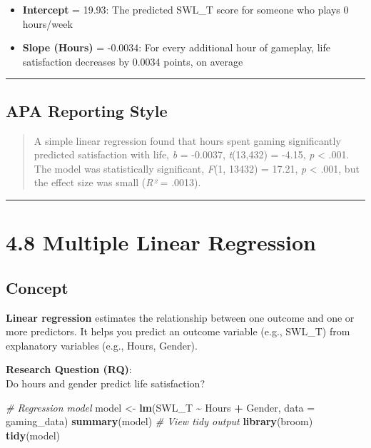 \documentclass[
]{book}
\newenvironment{Shaded}{\begin{snugshade}}{\end{snugshade}}
\newcommand{\AttributeTok}[1]{\textcolor[rgb]{0.13,0.29,0.53}{#1}}
\newcommand{\CommentTok}[1]{\textcolor[rgb]{0.56,0.35,0.01}{\textit{#1}}}
\newcommand{\FunctionTok}[1]{\textcolor[rgb]{0.13,0.29,0.53}{\textbf{#1}}}
\newcommand{\NormalTok}[1]{#1}
\newcommand{\OtherTok}[1]{\textcolor[rgb]{0.56,0.35,0.01}{#1}}
\newcommand{\SpecialCharTok}[1]{\textcolor[rgb]{0.81,0.36,0.00}{\textbf{#1}}}
\providecommand{\tightlist}{%
  \setlength{\itemsep}{0pt}\setlength{\parskip}{0pt}}
\begin{document}
\begin{itemize}
\tightlist
\item
  \textbf{Intercept} = 19.93: The predicted SWL\_T score for someone who plays 0 hours/week
\item
  \textbf{Slope (Hours)} = -0.0034: For every additional hour of gameplay, life satisfaction decreases by 0.0034 points, on average
\end{itemize}

\begin{center}\rule{0.5\linewidth}{0.5pt}\end{center}

\subsection{APA Reporting Style}\label{apa-reporting-style-2}

\begin{quote}
A simple linear regression found that hours spent gaming significantly predicted satisfaction with life, \emph{b} = -0.0037, \emph{t}(13,432) = -4.15, \emph{p} \textless{} .001. The model was statistically significant, \emph{F}(1, 13432) = 17.21, \emph{p} \textless{} .001, but the effect size was small (\emph{R²} = .0013).
\end{quote}

\begin{center}\rule{0.5\linewidth}{0.5pt}\end{center}

\section{4.8 Multiple Linear Regression}\label{multiple-linear-regression}

\subsection{Concept}\label{concept-7}

\textbf{Linear regression} estimates the relationship between one outcome and one or more predictors. It helps you predict an outcome variable (e.g., SWL\_T) from explanatory variables (e.g., Hours, Gender).

\textbf{Research Question (RQ)}:\\
Do hours and gender predict life satisfaction?

\begin{Shaded}
\begin{Highlighting}[]
\CommentTok{\# Regression model}
\NormalTok{model }\OtherTok{\textless{}{-}} \FunctionTok{lm}\NormalTok{(SWL\_T }\SpecialCharTok{\textasciitilde{}}\NormalTok{ Hours }\SpecialCharTok{+}\NormalTok{ Gender, }\AttributeTok{data =}\NormalTok{ gaming\_data)}
\FunctionTok{summary}\NormalTok{(model)}
\CommentTok{\# View tidy output}
\FunctionTok{library}\NormalTok{(broom)}
\FunctionTok{tidy}\NormalTok{(model)}
\end{Highlighting}
\end{Shaded}
\end{document}
